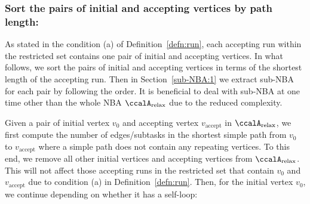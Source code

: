 \documentclass[Afour,sageh,times]{sagej}
\newcommand{\auto}[1]{\ccalA_{\text{#1}}}
\begin{document}
{%

  \subsubsection{Sort the pairs of initial and accepting vertices by path length:}\label{sec:sort}  As stated in the condition (a) of Definition~\ref{defn:run}, each accepting run within the restricted set  contains  one pair of initial and accepting vertices. In what follows, we sort the pairs of initial and accepting vertices in terms of the shortest length of the accepting run.  Then in Section~\ref{sub-NBA:1} we extract sub-NBA for each pair by following the order. It is beneficial to deal with sub-NBA at one time other than the whole NBA $\auto{relax}$ due to the reduced complexity.

  Given a pair of initial vertex $v_0$ and accepting vertex $v_{\text{accept}}$ in $\auto{relax}$, we first compute the number of edges/subtasks in the shortest simple path from  $v_0$ to $v_{\text{accept}}$ where a simple path does not contain any  repeating vertices. To this end, we remove all other initial vertices and accepting vertices from $\auto{relax}$. This will not affect those accepting runs in the restricted set that contain $v_0$ and $v_{\text{accept}}$ due to condition (a) in Definition~\ref{defn:run}.  Then, for the initial vertex $v_0$, we continue depending on whether it has a self-loop:

}
\end{document}
